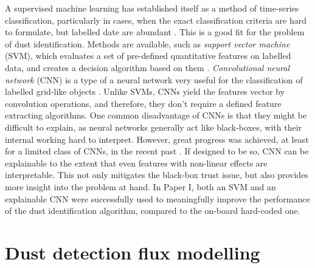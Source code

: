 A supervised machine learning has established itself as a method of time-series classification, particularly in cases, when the exact classification criteria are hard to formulate, but labelled date are abundant \citep{wickstrom2022mixing}. This is a good fit for the problem of dust identification. Methods are available, such as \textit{support vector machine} (SVM), which evaluates a set of pre-defined quantitative features on labelled data, and creates a decision algorithm based on them \citep{vapnik1997support}. \textit{Convolutional neural network} (CNN) is a type of a neural network very useful for the classification of labelled grid-like objects \citep{gu2018recent}. Unlike SVMs, CNNs yield the features vector by convolution operations, and therefore, they don't require a defined feature extracting algorithms. One common disadvantage of CNNs is that they might be difficult to explain, as neural networks generally act like black-boxes, with their internal working hard to interpret. However, great progress was achieved, at least for a limited class of CNNs, in the recent past \citep{samek2021explaining}. If designed to be so, CNN can be explainable to the extent that even features with non-linear effects are interpretable. This not only mitigates the black-box trust issue, but also provides more insight into the problem at hand. In Paper I, both an SVM and an explainable CNN were successfully used to meaningfully improve the performance of the dust identification algorithm, compared to the on-board hard-coded one.

\section{Dust detection flux modelling}

